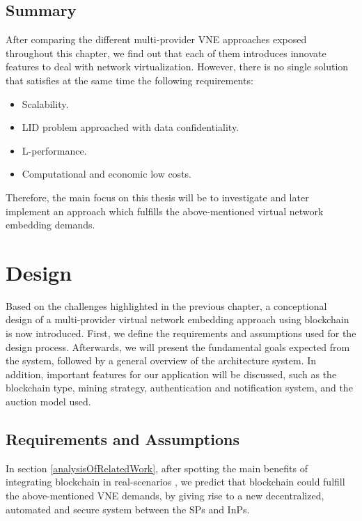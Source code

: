 \section{Summary}

After comparing the different multi-provider VNE approaches exposed throughout this chapter, we find out that each of them introduces innovate features to deal with network virtualization. However, there is no single solution that satisfies at the same time the following requirements:

\begin{itemize}
	\item Scalability.
	\item LID problem approached with data confidentiality.
	\item L-performance.
	\item Computational and economic low costs.
\end{itemize}

Therefore, the main focus on this thesis will be to investigate and later implement an approach which fulfills the above-mentioned virtual network embedding demands.


\chapter{Design}
\label{ch:design}

Based on the challenges highlighted in the previous chapter, a conceptional design of a multi-provider virtual network embedding approach using blockchain is now introduced. First, we define the requirements and assumptions used for the design process. Afterwards, we will present the fundamental goals expected from the system, followed by a general overview of the architecture system. In addition, important features for our application will be discussed, such as the blockchain type, mining strategy, authentication and notification system, and the auction model used.

\section{Requirements and Assumptions}

In section \ref{analysisOfRelatedWork}, after spotting the main benefits of integrating blockchain in real-scenarios , we predict that blockchain could fulfill the above-mentioned VNE demands, by giving rise to a new decentralized, automated and secure system between the SPs and InPs.

